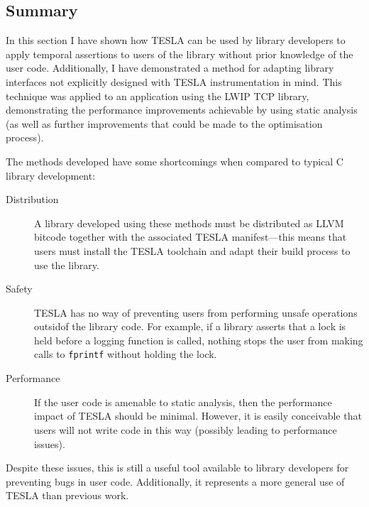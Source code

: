 \subsection{Summary}

In this section I have shown how TESLA can be used by library developers to
apply temporal assertions to users of the library without prior knowledge of the
user code. Additionally, I have demonstrated a method for adapting library
interfaces not explicitly designed with TESLA instrumentation in mind. This
technique was applied to an application using the LWIP TCP library,
demonstrating the performance improvements achievable by using static analysis
(as well as further improvements that could be made to the optimisation
process).

The methods developed have some shortcomings when compared to typical C library
development:
\begin{description}
  \item[Distribution] A library developed using these methods must be
    distributed as LLVM bitcode together with the associated TESLA
    manifest---this means that users must install the TESLA toolchain and adapt
    their build process to use the library.

  \item[Safety] TESLA has no way of preventing users from performing unsafe
    operations outsidof the library code. For example, if a library asserts that
    a lock is held before a logging function is called, nothing stops the user
    from making calls to \texttt{fprintf} without holding the lock.

  \item[Performance] If the user code is amenable to static analysis, then the
    performance impact of TESLA should be minimal. However, it is easily
    conceivable that users will not write code in this way (possibly leading to
    performance issues).
\end{description}

Despite these issues, this is still a useful tool available to library
developers for preventing bugs in user code. Additionally, it represents a more
general use of TESLA than previous work.
